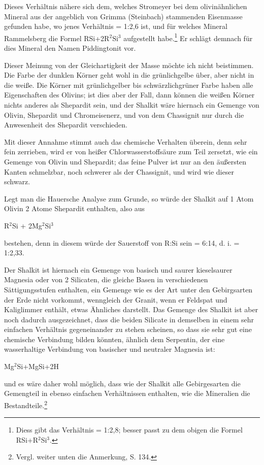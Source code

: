 \documentclass[a4paper, 11pt, oneside]{article}
\begin{document}
Dieses Verhältnis nähere sich dem, welches Stromeyer bei dem olivinähnlichen Mineral aus der angeblich von Grimma (Steinbach) stammenden Eisenmasse gefunden habe, wo jenes Verhältnis = 1:2,6 ist, und für welches Mineral Rammelsberg die Formel RSi+2R$^{2}$Si$^{3}$ aufgestellt habe.\footnote{Diess gibt das Verhältnis = 1:2,8; besser passt zu dem obigen die Formel RSi+R$^{2}$Si$^{3}$.} Er schlägt demnach für dies Mineral den Namen Piddingtonit vor.

Dieser Meinung von der Gleichartigkeit der Masse möchte ich nicht beistimmen. Die Farbe der dunklen Körner geht wohl in die grünlichgelbe über, aber nicht in die weiße. Die Körner mit grünlichgelber bis schwärzlichgrüner Farbe haben alle Eigenschaften des Olivins; ist dies aber der Fall, dann können die weißen Körner nichts anderes als Shepardit sein, und der Shalkit wäre hiernach ein Gemenge von Olivin, Shepardit und Chromeisenerz, und von dem Chassignit nur durch die Anwesenheit des Shepardit verschieden.

Mit dieser Annahme stimmt auch das chemische Verhalten überein, denn sehr fein zerrieben, wird er von heißer Chlorwasserstoffsäure zum Teil zersetzt, wie ein Gemenge von Olivin und Shepardit; das feine Pulver ist nur an den äußersten Kanten schmelzbar, noch schwerer als der Chassignit, und wird wie dieser schwarz.

Legt man die Hauersche Analyse zum Grunde, so würde der Shalkit auf 1 Atom Olivin 2 Atome Shepardit enthalten, also aus

R$^{2}$Si + 2Mg$^{2}$Si$^{3}$

bestehen, denn in diesem würde der Sauerstoff von R:Si sein = 6:14, d. i. = 1:2,33.

Der Shalkit ist hiernach ein Gemenge von basisch und saurer kieselsaurer Magnesia oder von 2 Silicaten, die gleiche Basen in verschiedenen Sättigungsstufen enthalten, ein Gemenge wie es der Art unter den Gebirgsarten der Erde nicht vorkommt, wenngleich der Granit, wenn er Feldspat und Kaliglimmer enthält, etwas Ähnliches darstellt. Das Gemenge des Shalkit ist aber noch dadurch ausgezeichnet, dass die beiden Silicate in demselben in einem sehr einfachen Verhältnis gegeneinander zu stehen scheinen, so dass sie sehr gut eine chemische Verbindung bilden könnten, ähnlich dem Serpentin, der eine wasserhaltige Verbindung von basischer und neutraler Magnesia ist:

Mg$^{2}$Si+MgSi+2H

und es wäre daher wohl möglich, dass wie der Shalkit alle Gebirgesarten die Gemengteil in ebenso einfachen Verhältnissen enthalten, wie die Mineralien die Bestandteile.\footnote{Vergl. weiter unten die Anmerkung, S. 134.}
\end{document}
